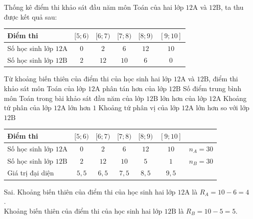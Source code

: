 \begin{ex}%
	Thống kê điểm thi khảo sát đầu năm môn Toán của hai lớp $12\mathrm{A}$ và $12\mathrm{B}$, ta thu được kết quả sau: 
	\begin{center}
		\begin{tabular}{|l|c|c|c|c|c|}
			\hline Điểm thi & $[5 ; 6)$ & $[6 ; 7)$ & $[7 ; 8)$ & $[8 ; 9)$ & $[9 ; 10]$ \\
			\hline 
			Số học sinh lớp $12\mathrm{A}$ & $0$ & $2$ & $6$ & $12$ & $10$ \\
			\hline 
			Số học sinh lớp $12\mathrm{B}$ & $2$ & $12$ & $10$ & $6$ & $0$ \\
			\hline
		\end{tabular}
	\end{center}
	\choiceTF
	{Từ khoảng biến thiên của điểm thi của học sinh hai lớp $12\mathrm{A}$ và $12\mathrm{B}$, điểm thi khảo sát môn Toán của lớp $12\mathrm{A}$ phân tán hơn của lớp $12\mathrm{B}$}
	{Số điểm trung bình môn Toán trong bài khảo sát đầu năm của lớp $12\mathrm{B}$ lớn hơn của lớp $12\mathrm{A}$}
	{\True Khoảng tứ phân của lớp $12\mathrm{A}$ lớn hơn $1$}
	{\True Khoảng tứ phân vị của lớp $12\mathrm{A}$ lớn hơn so với lớp $12\mathrm{B}$}
	\loigiai
	{
		\begin{center}
			\begin{tabular}{|l|c|c|c|c|c|c|}
				\hline Điểm thi & $[5 ; 6)$ & $[6 ; 7)$ & $[7 ; 8)$ & $[8 ; 9)$ & $[9 ; 10]$ & \\
				\hline 
				Số học sinh lớp $12\mathrm{A}$ & $0$ & $2$ & $6$ & $12$ & $10$ & $n_A=30$ \\
				\hline
				Số học sinh lớp $12\mathrm{B}$ & $2$ & $12$ & $10$ & $5$ & $1$ & $n_B=30$ \\
				\hline 
				Giá trị đại diện & $5{,}5$ & $6{,}5$ & $7{,}5$ & $8{,}5$ & $9{,}5$ & \\
				\hline
			\end{tabular}
		\end{center}
		\begin{itemchoice}
			\itemch Sai. Khoảng biến thiên của điểm thi của học sinh hai lớp $12\mathrm{A}$ là $R_A=10-6=4$.\\
			Khoảng biến thiên của điểm thi của học sinh hai lớp $12\mathrm{B}$ là $R_B=10-5=5$.

\end{itemchoice}}
\end{ex}
